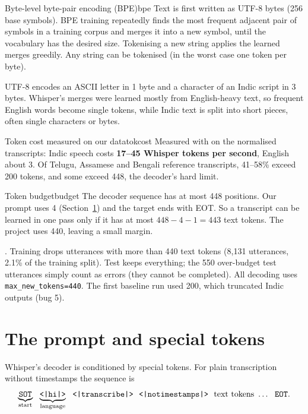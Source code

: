 \begin{definition}{Byte-level byte-pair encoding (BPE)}{bpe}
Text is first written as UTF-8 bytes (256 base symbols). BPE training repeatedly finds the most frequent adjacent pair of symbols in a
training corpus and merges it into a new symbol, until the vocabulary has the desired size. Tokenising a new string applies the
learned merges greedily. Any string can be tokenised (in the worst case one token per byte).
\end{definition}

UTF-8 encodes an ASCII letter in 1 byte and a character of an Indic script in 3 bytes. Whisper's merges were learned mostly from
English-heavy text, so frequent English words become single tokens, while Indic text is split into short pieces, often single
characters or bytes.

\begin{example}{Token cost measured on our data}{tokcost}
Measured with  on the normalised transcripts: Indic speech costs \textbf{17--45 Whisper tokens per second}, English
about 3. Of Telugu, Assamese and Bengali reference transcripts, 41--58\% exceed 200 tokens, and some exceed 448, the decoder's
hard limit.
\end{example}

\begin{proposition}{Token budget}{budget}
The decoder sequence has at most 448 positions. Our prompt uses 4 (Section~\ref{sec:prompt}) and the target ends with EOT. So a
transcript can be learned in one pass only if it has at most $448-4-1=443$ text tokens. The project uses 440, leaving a small margin.
\end{proposition}

\begin{incode}
. Training drops utterances with more than 440 text tokens (8{,}131 utterances, 2.1\% of
the training split). Test keeps everything; the 550 over-budget test utterances simply count as errors (they cannot be completed).
All decoding uses \texttt{max\_new\_tokens=440}. The first baseline run used 200, which truncated Indic outputs (bug 5).
\end{incode}

\section{The prompt and special tokens}
\label{sec:prompt}

Whisper's decoder is conditioned by special tokens. For plain transcription without timestamps the sequence is
\[
\underbrace{\texttt{SOT}}_{\text{start}}\ \ \underbrace{\tok{hi}}_{\text{language}}\ \ \tok{transcribe}\ \ \tok{notimestamps}\ \
\text{text tokens}\ \dots\ \ \texttt{EOT}.
\]

